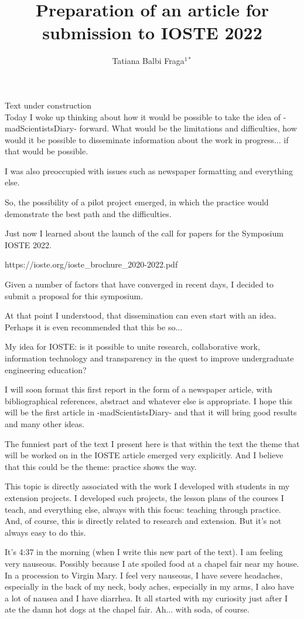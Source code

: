 \documentclass{book}
\title{Preparation of an article for submission to IOSTE 2022}
\author{Tatiana Balbi Fraga$^{1*}$}
\begin{document}
Text under construction \\

Today I woke up thinking about how it would be possible to take the idea of -madScientistsDiary- forward. What would be the limitations and difficulties, how would it be possible to disseminate information about the work in progress... if that would be possible.

I was also preoccupied with issues such as newspaper formatting and everything else.

So, the possibility of a pilot project emerged, in which the practice would demonstrate the best path and the difficulties.

Just now I learned about the launch of the call for papers for the Symposium IOSTE 2022.

https://ioste.org/ioste\_brochure\_2020-2022.pdf

Given a number of factors that have converged in recent days, I decided to submit a proposal for this symposium.

At that point I understood, that dissemination can even start with an idea. Perhaps it is even recommended that this be so...

My idea for IOSTE: is it possible to unite research, collaborative work, information technology and transparency in the quest to improve undergraduate engineering education?

I will soon format this first report in the form of a newspaper article, with bibliographical references, abstract and whatever else is appropriate. I hope this will be the first article in -madScientistsDiary- and that it will bring good results and many other ideas.

The funniest part of the text I present here is that within the text the theme that will be worked on in the IOSTE article emerged very explicitly. And I believe that this could be the theme: practice shows the way.

This topic is directly associated with the work I developed with students in my extension projects. I developed such projects, the lesson plans of the courses I teach, and everything else, always with this focus: teaching through practice. And, of course, this is directly related to research and extension. But it's not always easy to do this.

It's 4:37 in the morning (when I write this new part of the text). I am feeling very nauseous. Possibly because I ate spoiled food at a chapel fair near my house. In a procession to Virgin Mary. I feel very nauseous, I have severe headaches, especially in the back of my neck, body aches, especially in my arms, I also have a lot of nausea and I have diarrhea. It all started with my curiosity just after I ate the damn hot dogs at the chapel fair. Ah... with soda, of course.
\end{document}
